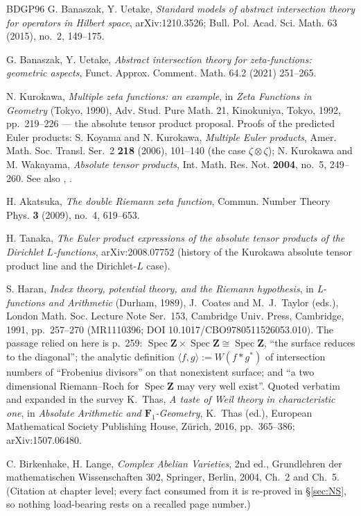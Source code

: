 \documentclass[11pt]{article}
\theoremstyle{definition}
\theoremstyle{remark}
\newcommand{\Z}{\mathbf{Z}}
\newcommand{\Fun}{\mathbf{F}_1}
\newcommand{\SpecZ}{\operatorname{Spec}\Z}
\begin{document}
\begin{thebibliography}{BDGP96}
 G. Banaszak, Y. Uetake, \emph{Standard models of
abstract intersection theory for operators in Hilbert space},
arXiv:1210.3526; Bull. Pol. Acad. Sci. Math. 63 (2015), no.~2, 149--175.

 G. Banaszak, Y. Uetake, \emph{Abstract intersection
theory for zeta-functions: geometric aspects}, Funct. Approx.
Comment. Math. 64.2 (2021) 251--265.

 N. Kurokawa, \emph{Multiple zeta functions: an
example}, in \emph{Zeta Functions in Geometry} (Tokyo, 1990), Adv. Stud.
Pure Math. 21, Kinokuniya, Tokyo, 1992, pp.~219--226 --- the absolute
tensor product proposal. Proofs of the predicted Euler products:
S. Koyama and N. Kurokawa, \emph{Multiple Euler products}, Amer. Math.
Soc. Transl. Ser.~2 \textbf{218} (2006), 101--140 (the case
$\zeta \otimes \zeta$); N. Kurokawa and M. Wakayama, \emph{Absolute
tensor products}, Int. Math. Res. Not. \textbf{2004}, no.~5, 249--260.
See also \cite{Ak09}, \cite{Ta20}.

 H. Akatsuka, \emph{The double Riemann zeta function},
Commun. Number Theory Phys. \textbf{3} (2009), no.~4, 619--653.

 H. Tanaka, \emph{The Euler product expressions of the
absolute tensor products of the Dirichlet $L$-functions},
arXiv:2008.07752 (history of the Kurokawa absolute tensor product line
and the Dirichlet-$L$ case).

 S. Haran, \emph{Index theory, potential theory, and the
Riemann hypothesis}, in \emph{L-functions and Arithmetic} (Durham, 1989),
J.~Coates and M.~J.~Taylor (eds.), London Math. Soc. Lecture Note Ser.\ 153,
Cambridge Univ. Press, Cambridge, 1991, pp.~257--270 (MR1110396; DOI
10.1017/CBO9780511526053.010). The passage relied on here is p.~259:
$\SpecZ \times \SpecZ \cong \SpecZ$, ``the surface reduces to the
diagonal''; the analytic definition $\langle f,g \rangle := W(f * g^{*})$ of
intersection numbers of ``Frobenius divisors'' on that nonexistent surface;
and ``a two dimensional Riemann--Roch for $\SpecZ$ may very well exist''.
Quoted verbatim and expanded in the survey K.~Thas, \emph{A taste of Weil
theory in characteristic one}, in \emph{Absolute Arithmetic and
$\Fun$-Geometry}, K.~Thas (ed.), European Mathematical Society Publishing
House, Z\"urich, 2016, pp.~365--386; arXiv:1507.06480.

 C. Birkenhake, H. Lange, \emph{Complex Abelian Varieties},
2nd ed., Grundlehren der mathematischen Wissenschaften 302, Springer,
Berlin, 2004, Ch.~2 and Ch.~5. (Citation at chapter level; every fact consumed
from it is re-proved in \S\ref{sec:NS}, so nothing load-bearing rests on a
recalled page number.)


\end{thebibliography}
\end{document}
